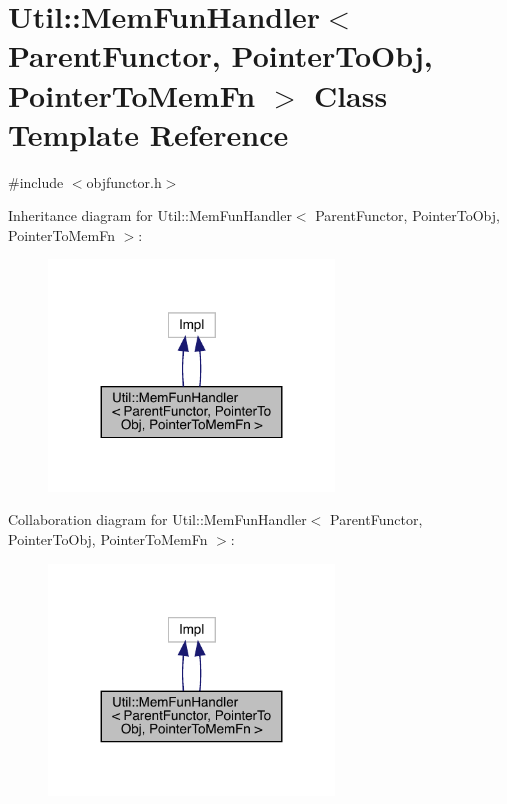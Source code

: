 \hypertarget{classUtil_1_1MemFunHandler}{}\section{Util\+:\+:Mem\+Fun\+Handler$<$ Parent\+Functor, Pointer\+To\+Obj, Pointer\+To\+Mem\+Fn $>$ Class Template Reference}
\label{classUtil_1_1MemFunHandler}


{\ttfamily \#include $<$objfunctor.\+h$>$}



Inheritance diagram for Util\+:\+:Mem\+Fun\+Handler$<$ Parent\+Functor, Pointer\+To\+Obj, Pointer\+To\+Mem\+Fn $>$\+:\nopagebreak
\begin{figure}[H]
\begin{center}
\leavevmode
\includegraphics[width=215pt]{d8/d92/classUtil_1_1MemFunHandler__inherit__graph}
\end{center}
\end{figure}


Collaboration diagram for Util\+:\+:Mem\+Fun\+Handler$<$ Parent\+Functor, Pointer\+To\+Obj, Pointer\+To\+Mem\+Fn $>$\+:\nopagebreak
\begin{figure}[H]
\begin{center}
\leavevmode
\includegraphics[width=215pt]{de/d23/classUtil_1_1MemFunHandler__coll__graph}
\end{center}
\end{figure}

